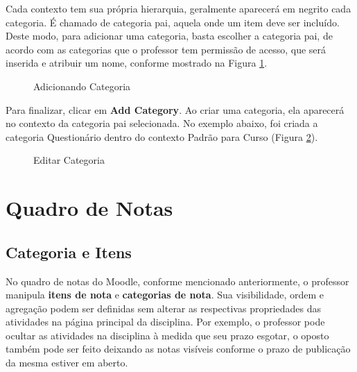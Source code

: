 Cada contexto tem sua própria hierarquia, geralmente aparecerá em negrito cada categoria. É chamado de categoria pai, aquela onde um item deve ser incluído. Deste modo, para adicionar uma categoria, basta escolher a categoria pai, de acordo com as categorias que o professor tem permissão de acesso, que será inserida e atribuir um nome, conforme mostrado na Figura \ref{fig:cap6_27}.

\begin{figure}[htbp]
 \begin{center}
  \caption{Adicionando Categoria}
  \label{fig:cap6_27}
 \end{center}
\end{figure}

Para finalizar, clicar em  \textbf{Add Category}.
Ao criar uma categoria, ela aparecerá no contexto da categoria pai selecionada. No exemplo abaixo, foi criada a categoria Questionário dentro do contexto Padrão para Curso (Figura \ref{fig:cap6_28}). 

\begin{figure}[htbp]
 \begin{center}
  \caption{Editar Categoria}
  \label{fig:cap6_28}
 \end{center}
\end{figure}

\section{Quadro de Notas}

\subsection{Categoria e Itens}

No quadro de notas do Moodle, conforme mencionado anteriormente, o professor manipula \textbf{itens de nota} e \textbf{categorias de nota}. Sua visibilidade, ordem e agregação podem ser definidas sem alterar as respectivas propriedades das atividades na página principal da disciplina. Por exemplo, o professor pode ocultar as atividades na disciplina à medida que seu prazo esgotar, o oposto também pode ser feito deixando as notas visíveis conforme o prazo de publicação da mesma estiver em aberto.

